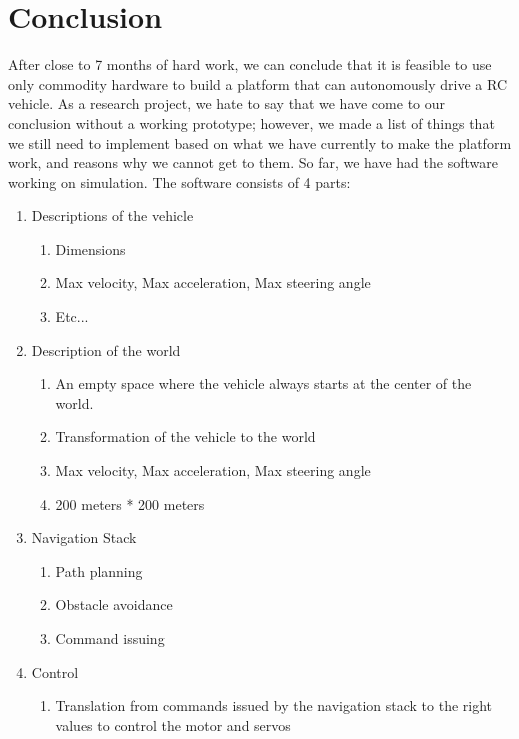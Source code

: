 \documentclass[compsoc,draftclsnofoot,onecolumn,10pt]{IEEEtran}
\begin{document}
\section{Conclusion}
After close to 7 months of hard work, we can conclude that it is feasible to use only commodity hardware to build a platform that can autonomously drive a RC vehicle. As a research project, we hate to say that we have come to our conclusion without a working prototype; however, we made a list of things that we still need to implement based on what we have currently to make the platform work, and reasons why we cannot get to them.
So far, we have had the software working on simulation. The software consists of 4 parts:
\begin{enumerate}
    \item Descriptions of the vehicle
     \begin{enumerate}
     \item Dimensions
     \item Max velocity, Max acceleration, Max steering angle
     \item Etc...
    \end{enumerate}
    
    \item Description of the world
    \begin{enumerate}
     \item An empty space where the vehicle always starts at the center of the world.
     \item Transformation of the vehicle to the world
     \item Max velocity, Max acceleration, Max steering angle
     \item 200 meters * 200 meters
    \end{enumerate}
    
    \item Navigation Stack
     \begin{enumerate}
     \item Path planning
     \item Obstacle avoidance
     \item Command issuing
    \end{enumerate}
    
    \item Control
    \begin{enumerate}
        \item Translation from commands issued by the navigation stack to the right values to control the motor and servos
    \end{enumerate}
    
    
\end{enumerate}
\end{document}
